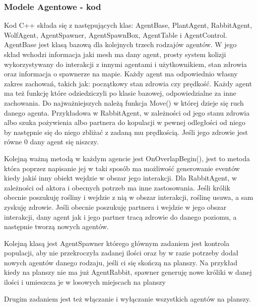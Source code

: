 \documentclass[a4paper,12pt,reqno]{article}
\begin{document}
\subsubsection{Modele Agentowe - kod}

Kod C++ składa się z następujących klas: AgentBase, PlantAgent, RabbitAgent, WolfAgent, AgentSpawner, AgentSpawnBox, AgentTable i AgentControl. 
AgentBase jest klasą bazową dla kolejnych trzech rodzajów agentów. W jego skład wchodzi informacja jaki mesh ma dany agent, prosty system kolizji wykorzystywany do interakcji z innymi agentami i użytkownikiem, stan zdrowia oraz informacja o spawnerze na mapie. Każdy agent ma odpowiednio własny zakres zachowań, takich jak: początkowy stan zdrowia czy prędkość. Każdy agent ma też funkcję które odziedziczyli po klasie bazowej, odpowiedzialne za inne zachowania. Do najważniejszych należą funkcja Move() w której dzieje się ruch danego agenta. Przykładowa w RabbitAgent, w zależności od jego stanu zdrowia albo szuka pożywienia albo partnera do kopulacji w pewnej odległości od niego by następnie się do niego zbliżać z zadaną mu prędkością. Jeśli jego zdrowie jest równe 0 dany agent się niszczy.



Kolejną ważną metodą w każdym agencie jest OnOverlapBegin(), jest to metoda która poprzez napisanie jej w taki sposób ma możliwość generowanie eventów kiedy jakiś inny obiekt wejdzie w obszar jego interakcji. Dla RabbitAgent, w zależności od aktora i obecnych potrzeb ma inne zastosowania. Jeśli królik obecnie poszukuję rośliny i wejdzie z nią w obszar interakcji, roślinę usuwa, a sam zyskuję zdrowie. Jeśli obecnie poszukuję partnera i wejdzie w jego obszar interakcji, dany agent jak i jego partner tracą zdrowie do danego poziomu, a następnie tworzą nowych agentów.
	


Kolejną klasą jest AgentSpawner którego głównym zadaniem jest kontrola populacji, aby nie przekroczyła zadanej ilości oraz by w razie potrzeby dodał nowych agentów danego rodzaju, jeśli ci się skończą na planszy. Na przykład kiedy na planszy nie ma już AgentRabbit, spawner generuję nowe króliki w danej ilości i umieszcza je w losowych miejscach na planszy


Drugim zadaniem jest też włączanie i wyłączanie wszystkich agentów na planszy.
\end{document}
